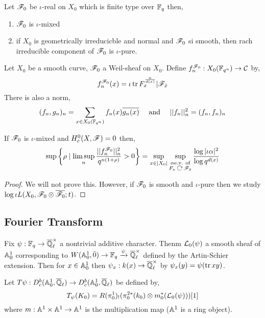 \documentclass[12pt]{article}
\begin{document}
\begin{cor}
Let $\mathscr{F}_0$ be $\iota$-real on $X_0$ which is finite type over $\mathbb{F}_q$ then,
\begin{enumerate}
\item $\mathscr{F}_0$ is $\iota$-mixed
\item if $X_0$ is geometrically irreducicble and normal and $\mathscr{F}_0$ si smooth, then rach irreducible component of $\mathscr{F}_0$ is $\iota$-pure. 
\end{enumerate}
\end{cor}

\begin{defn}
Let $X_0$ be a smooth curve, $\mathscr{F}_0$ a Weil-sheaf on $X_0$. Define $f_n^{\mathscr{F}_0} : X_0(\mathbb{F}_{q^n}) \to \mathcal{C}$ by,
\[ f_n^{\mathscr{F}_0}(x) = \iota \operatorname{\mathrm{tr}}{F_x^{\frac{n}{d(x)}} | \mathscr{F}_{\bar{x}}} \]
There is also a norm,
\[ (f_n, g_n)_n = \sum_{x \in X_0(\mathbb{F}_{q^n})} f_n(x) \overline{g_n(x)} \quad \text{ and } \quad || f_n ||_n^2 = (f_n, f_n)_n \]
\end{defn}

\begin{prop}
If $\mathscr{F}_0$ is $\iota$-mixed and $H_c^0(X, \mathscr{F}) = 0$ then,
\[ \sup \left\{ \rho \mid \limsup_n \frac{|| f_n^{\F_0} ||_n^2}{q^{n(1+\rho)}} > 0 \right\} = \sup_{x \in |X_0|} \sup_{\substack{\alpha \text{e.v. of} \\ F_x \acts \F_{\bar{x}}}} \frac{\log{|\iota \alpha|^2}}{\log{q^{d(x)}}} \]
\end{prop}

\begin{proof}
We will not prove this. However, if $\mathscr{F}_0$ is smooth and $\iota$-pure then we study $\log{\iota L(X_0, \mathscr{F}_0 \otimes \overline{\mathscr{F}_0}; t)}$.
\end{proof}

\subsection{Fourier Transform}

Fix $\psi : \mathbb{F}_q \to \overline{\mathbb{Q}}_\ell^\times$ a nontrivial additive character. Thenm $\mathcal{L}_0(\psi)$ a smooth sheaf of $\mathbb{A}^1_0$ corresponding to $W(\mathbb{A}^1_0, \bar{0}) \to \mathbb{F}_q \xrightarrow{\psi} \overline{\mathbb{Q}}_\ell^\times$ defined by the Artin-Schier extension. Then for $x \in \mathbb{A}^1_{0}$ then $\psi_x : k(x) \to \overline{\mathbb{Q}}_\ell^\times$ by $\psi_x(y) = \psi(\operatorname{\mathrm{tr}}{xy})$.

\begin{defn}
Let $T \psi : D_c^b(\mathbb{A}^1_0, \overline{\mathbb{Q}}_\ell) \to D_c^b(\mathbb{A}^1_0, \overline{\mathbb{Q}}_\ell)$ be defined by,
\[ T_\psi(K_0) = R (\pi^1_0)_! (\pi^{2*}_0(k_0) \otimes m_0^*(\mathcal{L}_0(\psi))) [1] \]
where $m : \mathbb{A}^1 \times \mathbb{A}^1 \to \mathbb{A}^1$ is the multiplication map ($\mathbb{A}^1$ is a ring object). 
\end{defn}
\end{document}
